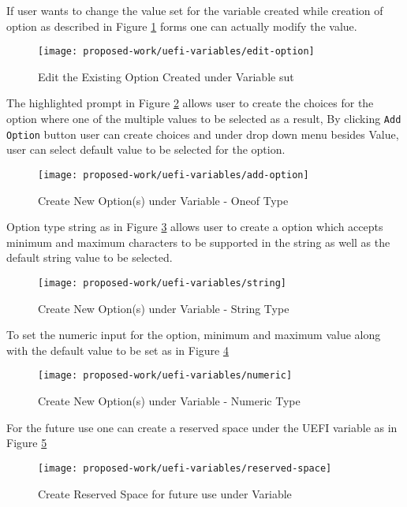 If user wants to change the value set for the variable created while creation of option as described in Figure \ref{fig:uefi-variable-edit-option} forms one can actually modify the value.
\begin{figure}[!htbp]
  \centering
  \texttt{[image: proposed-work/uefi-variables/edit-option]}
  \caption{Edit the Existing Option Created under Variable \gls{sut}}\label{fig:uefi-variable-edit-option}
\end{figure}

The highlighted prompt in Figure \ref{fig:uefi-variable-add-option} allows user to create the choices for the option where one of the multiple values to be selected as a result, By clicking \verb|Add Option| button user can create choices and under drop down menu besides Value, user can select default value to be selected for the option. 
\begin{figure}[!htbp]
  \centering
  \texttt{[image: proposed-work/uefi-variables/add-option]}
  \caption{Create New Option(s) under Variable - Oneof Type}\label{fig:uefi-variable-add-option}
\end{figure}

Option type string as in Figure \ref{fig:uefi-variable-string} allows user to create a option which accepts minimum and maximum characters to be supported in the string as well as the default string value to be selected. 
\begin{figure}[!htbp]
	\centering
	\texttt{[image: proposed-work/uefi-variables/string]}
	\caption{Create New Option(s) under Variable - String Type}\label{fig:uefi-variable-string}
\end{figure}

To set the numeric input for the option, minimum and maximum value along with the default value to be set as in Figure \ref{fig:uefi-variable-numeric}
\begin{figure}[!htbp]
  \centering
  \texttt{[image: proposed-work/uefi-variables/numeric]}
  \caption{Create New Option(s) under Variable - Numeric Type}\label{fig:uefi-variable-numeric}
\end{figure}

For the future use one can create a reserved space under the UEFI variable as in Figure \ref{fig:uefi-variable-reserved-space}
\begin{figure}[!htbp]
  \centering
  \texttt{[image: proposed-work/uefi-variables/reserved-space]}
  \caption{Create Reserved Space for future use under Variable}\label{fig:uefi-variable-reserved-space}
\end{figure}


